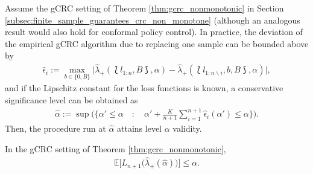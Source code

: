 Assume the gCRC setting of Theorem \ref{thm:gcrc_nonmonotonic} in Section \ref{subsec:finite_sample_guarantees_crc_non_monotone} (although an analogous result would also hold for conformal policy control). In practice, the deviation of the empirical gCRC algorithm due to replacing one sample can be bounded above by
\begin{align*}
    \hat\epsilon_i := \max_{b\in \{0, B\}}\Big|\hat\lambda_+(\lbag l_{1:n}, B\rbag, \alpha)-\hat\lambda_+(\lbag l_{1:n\backslash i}, b, B\rbag, \alpha)\Big|,
\end{align*}
and if the Lipschitz constant for the loss functions is known, a conservative significance level can be obtained as
\begin{align*}
    \hat\alpha := \sup\Big(\Big\{\alpha' \leq \alpha \quad : \quad \alpha' + \frac{K}{n+1}\sum_{i=1}^{n+1}\hat\epsilon_i(\alpha')\leq \alpha\Big\}  \Big). 
\end{align*}
Then, the procedure run at $\hat\alpha$ attains level $\alpha$ validity.
\begin{proposition}
    In the gCRC setting of Theorem \ref{thm:gcrc_nonmonotonic},
    \begin{align*}
        \mathbb{E}\big[L_{n+1}\big(\hat{\lambda}_{+}(\hat\alpha)\big)\big] \leq \alpha.
    \end{align*}
\end{proposition}






